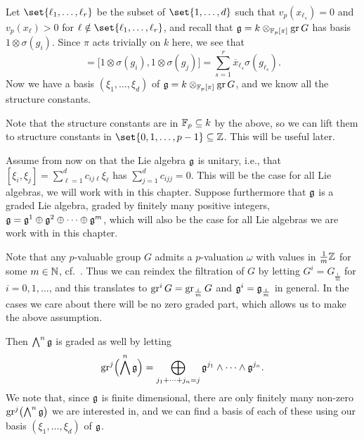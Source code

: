 Let $\set{\ell_{1},\dotsc,\ell_{r}}$ be the subset of $\set{1,\dotsc,d}$ such that $v_{p}(x_{\ell_{s}}) = 0$ and $v_{p}(x_{\ell}) > 0$ for $\ell \notin \set{\ell_{1},\dotsc,\ell_{r}}$, and recall that $\mathfrak{g} = k \otimes_{\mathbb{F}_{p}[\pi]} \operatorname{gr} G$ has basis $1 \otimes \sigma(g_{i})$. Since $\pi$ acts trivially on $k$ here, we see that
\begin{equation*}
  [\xi_{i},\xi_{j}] = \bigl[ 1\otimes\sigma(g_{i}),1\otimes\sigma(g_{j}) \bigr] = \sum_{s=1}^{r} \overline{x}_{\ell_{s}} \sigma(g_{\ell_{s}}).
\end{equation*}
Now we have a basis $(\xi_{1},\dotsc,\xi_{d})$ of $\mathfrak{g} = k \otimes_{\mathbb{F}_{p}[\pi]} \operatorname{gr} G$, and we know all the structure constants.

\begin{remark}\label{rem:struc-consts-lift}
  Note that the structure constants are in $\mathbb{F}_{p} \subseteq k$ by the above, so we can lift them to structure constants in $\set{0,1,\dotsc,p-1} \subseteq \Z$. This will be useful later.
\end{remark}

Assume from now on that the Lie algebra $\mathfrak{g}$ is unitary, i.e., that $[\xi_{i},\xi_{j}] = \sum_{\ell=1}^{d} c_{ij\ell} \xi_{\ell}$ has $\sum_{j=1}^{d} c_{ijj} = 0$. This will be the case for all Lie algebras, we will work with in this chapter. Suppose furthermore that $\mathfrak{g}$ is a graded Lie algebra, graded by finitely many positive integers, $\mathfrak{g} = \mathfrak{g}^{1} \oplus \mathfrak{g}^{2} \oplus \dotsb \oplus \mathfrak{g}^{m}$, which will also be the case for all Lie algebras we are work with in this chapter.

\begin{remark}\label{rem:g-Z-grading}
  Note that any $p$-valuable group $G$ admits a $p$-valuation $\omega$ with values in $\frac{1}{m}\mathbb{Z}$ for some $m \in \mathbb{N}$, cf.\ \cite[Cor.~33.3]{Sch}. Thus we can reindex the filtration of $G$ by letting $G^{i} = G_{\frac{i}{m}}$ for $i=0,1,\dotsc$, and this translates to $\operatorname{gr}^{i} G = \operatorname{gr}_{\frac{i}{m}} G$ and $\mathfrak{g}^{i} = \mathfrak{g}_{\frac{i}{m}}$ in general. In the cases we care about there will be no zero graded part, which allows us to make the above assumption.
\end{remark}

Then $\bigwedge^{n} \mathfrak{g}$ is graded as well by letting
\begin{equation*}
  \operatorname{gr}^{j}\Bigl( \bigwedge^{n}\mathfrak{g} \Bigr) = \bigoplus_{j_{1} + \dotsb + j_{n} = j} \mathfrak{g}^{j_{1}} \wedge \dotsb \wedge \mathfrak{g}^{j_{n}}.
\end{equation*}
We note that, since $\mathfrak{g}$ is finite dimensional, there are only finitely many non-zero $\operatorname{gr}^{j}\bigl( \bigwedge^{n} \mathfrak{g} \bigr)$ we are interested in, and we can find a basis of each of these using our basis $(\xi_{1},\dotsc,\xi_{d})$ of $\mathfrak{g}$.

